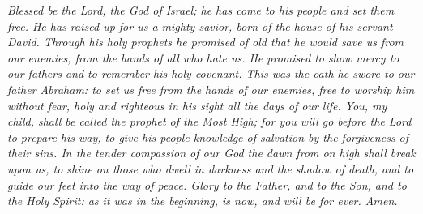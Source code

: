 \vspace{10pt}

\emph{Blessed be the Lord, the God of Israel; he has come to his people and set them free. He has raised up for us a mighty savior, born of the house of his servant David. Through his holy prophets he promised of old that he would save us from our enemies, from the hands of all who hate us. He promised to show mercy to our fathers and to remember his holy covenant. This was the oath he swore to our father Abraham: to set us free from the hands of our enemies, free to worship him without fear, holy and righteous in his sight all the days of our life. You, my child, shall be called the prophet of the Most High; for you will go before the Lord to prepare his way, to give his people knowledge of salvation by the forgiveness of their sins. In the tender compassion of our God the dawn from on high shall break upon us, to shine on those who dwell in darkness and the shadow of death, and to guide our feet into the way of peace. Glory to the Father, and to the Son, and to the Holy Spirit: as it was in the beginning, is now, and will be for ever. Amen.}
